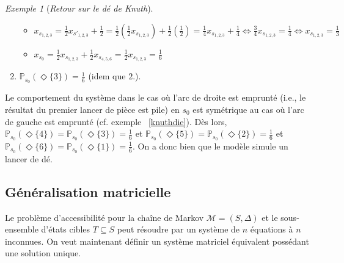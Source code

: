 \documentclass[12pt,a4paper]{report}
\theoremstyle{definition}%
\theoremstyle{remark}
\newtheorem{example}{Exemple}[chapter]
\newcommand{\ie}{i.e., }
\newcommand{\cf}{cf. }
\begin{document}
\begin{example}[\textit{Retour sur le dé de Knuth}]
\begin{spacing}{1.5}
\begin{enumerate}
\begin{itemize}
			\item $x_{s_{1, 2, 3}} = \frac{1}{2} x_{s'_{1, 2, 3}} + \frac{1}{2}  = 
			\frac{1}{2} (\frac{1}{2} x_{s_{1, 2, 3}}) +\frac{1}{2} (\frac{1}{2})
			= \frac{1}{4} x_{s_{1, 2, 3}} +\frac{1}{4}
			\Leftrightarrow \frac{3}{4} x_{s_{1, 2, 3}} = \frac{1}{4}
			\Leftrightarrow x_{s_{1, 2, 3}} = \frac{1}{3}$
			\item $x_{s_0} = \frac{1}{2} x_{s_{1,2,3}} + \frac{1}{2} x_{s_{4, 5, 6}} = \frac{1}{2} x_{s_{1,2,3}} = \frac{1}{6}$
		\end{itemize}
		\item $\mathbb{P}_{s_0} (\Diamond \{3\}) = \frac{1}{6}$ (idem que $2.$).
	\end{enumerate}\end{spacing}
	Le comportement du système dans le cas où l'arc de droite est emprunté (\ie le résultat du premier lancer de pièce est pile) en $s_0$ est symétrique au cas où l'arc de gauche est emprunté (\cf exemple  ~\ref{knuthdie}). Dès lors, $\mathbb{P}_{s_0}(\Diamond \{4\}) = \mathbb{P}_{s_0}(\Diamond \{3\}) = \frac{1}{6}$ et $\mathbb{P}_{s_0}(\Diamond \{5\}) = \mathbb{P}_{s_0}(\Diamond \{2\}) = \frac{1}{6}$ et $\mathbb{P}_{s_0}(\Diamond \{6\}) = \mathbb{P}_{s_0}(\Diamond \{1\}) = \frac{1}{6}$. On a donc bien que le modèle simule un lancer de dé.
	
\end{example}

\subsection{Généralisation matricielle}
Le problème d'accessibilité pour la chaîne de Markov $\mathcal{M} = (S, \Delta)$ et le sous-ensemble d'états cibles $T \subseteq S$ peut résoudre par un système de $n$ équations à $n$ inconnues. On veut maintenant définir un système matriciel équivalent possédant une solution unique.\\
\end{document}
